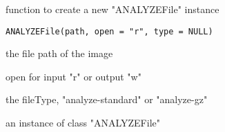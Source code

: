 \begin{Description}\relax
function to create a new "ANALYZEFile" instance
\end{Description}
\begin{Usage}
\begin{verbatim}
ANALYZEFile(path, open = "r", type = NULL)
\end{verbatim}
\end{Usage}
\begin{Arguments}
\begin{ldescription}
\item[\code{path}] the file path of the image 
\item[\code{open}] open for input "r" or output "w" 
\item[\code{type}] the fileType, "analyze-standard" or "analyze-gz" 
\end{ldescription}
\end{Arguments}
\begin{Value}
an instance of class "ANALYZEFile"
\end{Value}


